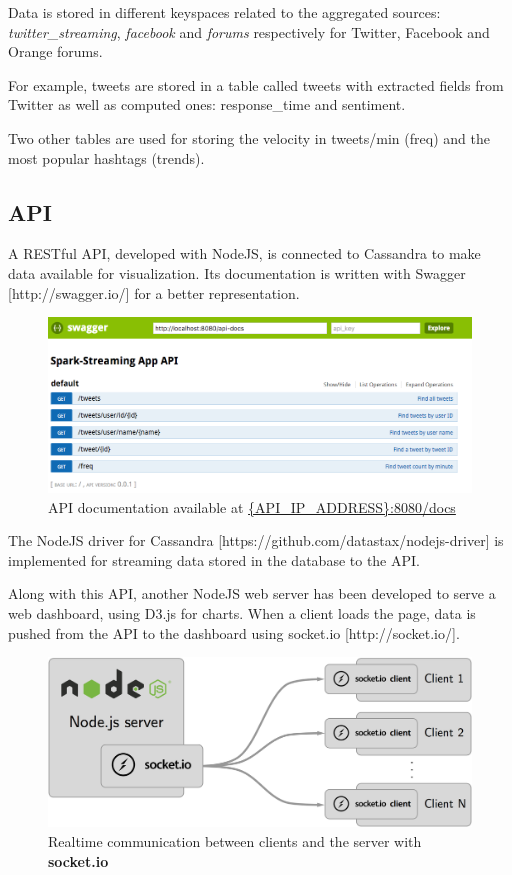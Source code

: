 \documentclass[11pt]{article}
\begin{document}
Data is stored in different keyspaces related to the aggregated sources: \textit{twitter\_streaming}, \textit{facebook} and \textit{forums} respectively for Twitter, Facebook and Orange forums.

For example, tweets are stored in a table called tweets with extracted fields from Twitter as well as computed ones: response\_time and sentiment.
          
Two other tables are used for storing the velocity in tweets/min (freq) and the most popular hashtags (trends).

\subsection{API}

A RESTful API, developed with NodeJS, is connected to Cassandra to make data available for visualization. 
Its documentation is written with Swagger [http://swagger.io/] for a better representation.

\begin{figure}[h!]
    \centering
    \includegraphics[scale=0.4]{img/api-docs.png}
    \caption{API documentation available at \url{{API_IP_ADDRESS}:8080/docs}}
    \label{socket}
\end{figure}

The NodeJS driver for Cassandra [https://github.com/datastax/nodejs-driver] is implemented for streaming data stored in the database to the API.

Along with this API, another NodeJS web server has been developed to serve a web dashboard, using D3.js for charts. When a client loads the page, data is pushed from the API to the dashboard using socket.io [http://socket.io/]. 

\begin{figure}[h!]
    \centering
    \includegraphics[scale=0.12]{img/api-dashboard-socket.png}
    \caption{Realtime communication between clients and the server with \textbf{socket.io}}
    \label{socket}
\end{figure}
\end{document}
